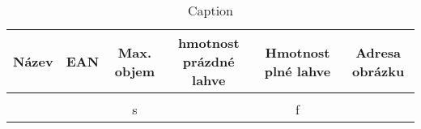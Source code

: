\begin{table}
    \centering
    \begin{tabular}{|c|c|c|c|c|c|} 
        \hline
        Název & EAN & Max. objem & hmotnost prázdné lahve & Hmotnost plné lahve & Adresa obrázku\\ \hline
         &  &  &  &  & \\ \hline
         &  & s &  &  f& \\ \hline
    \end{tabular}
    \caption{Caption}
    \label{tab:my_label}
\end{table}